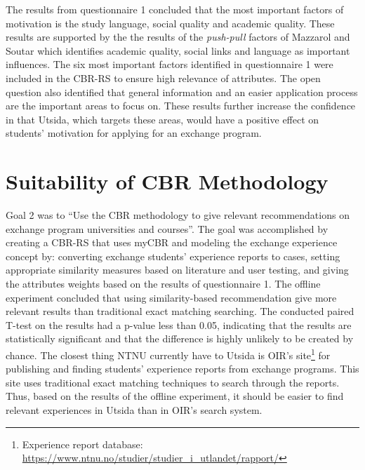 The results from questionnaire 1 concluded that the most important factors of motivation is the study language, social quality and academic quality. These results are supported by the the results of the \emph{push-pull} factors of Mazzarol and Soutar \cite{mazzarol2002push} which identifies academic quality, social links and language as important influences. The six most important factors identified in questionnaire 1 were included in the CBR-RS to ensure high relevance of attributes. The open question also identified that general information and an easier application process are the important areas to focus on. These results further increase the confidence in that Utsida, which targets these areas, would have a positive effect on students' motivation for applying for an exchange program.



\section{Suitability of CBR Methodology}

Goal 2 was to \enquote{Use the CBR methodology to give relevant recommendations on exchange program universities and courses}. The goal was accomplished by creating a CBR-RS that uses myCBR and modeling the exchange experience concept by: converting exchange students' experience reports to cases, setting appropriate similarity measures based on literature and user testing, and giving the attributes weights based on the results of questionnaire 1. The offline experiment concluded that using similarity-based recommendation give more relevant results than traditional exact matching searching. The conducted paired T-test on the results had a p-value less than 0.05, indicating that the results are statistically significant and that the difference is highly unlikely to be created by chance. The closest thing NTNU currently have to Utsida is OIR's site\footnote{Experience report database: \url{https://www.ntnu.no/studier/studier_i_utlandet/rapport/}} for publishing and finding students' experience reports from exchange programs. This site uses traditional exact matching techniques to search through the reports. Thus, based on the results of the offline experiment, it should be easier to find relevant experiences in Utsida than in OIR's search system. 

